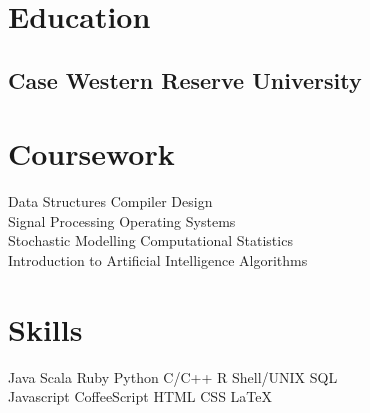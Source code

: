 \documentclass[]{deedy-resume-openfont}
\begin{document}
%
%



\begin{minipage}[t]{0.49\textwidth}


\section{Education}
\subsection{Case Western Reserve University}
\sectionsep


\end{minipage}
\hfill
\begin{minipage}[t]{0.49\textwidth}



\section{Coursework}
\begin{spacing}{1.5}
Data Structures \textbullet{} Compiler Design \\
Signal Processing \textbullet{} Operating Systems \\
Stochastic Modelling \textbullet{} Computational Statistics \\
Introduction to Artificial Intelligence \textbullet{} Algorithms \\
\end{spacing}
\end{minipage}


\vspace{-15pt}
\section{Skills}
 \descript{}
\vspace{1pt}
Java \textbullet{} Scala \textbullet{} Ruby \textbullet{} Python \textbullet{} C/C++ \textbullet{} R \textbullet{} Shell/UNIX \textbullet{} SQL \\
Javascript \textbullet{} CoffeeScript \textbullet{} HTML \textbullet{} CSS \textbullet{} \LaTeX
\sectionsep
\end{document}
